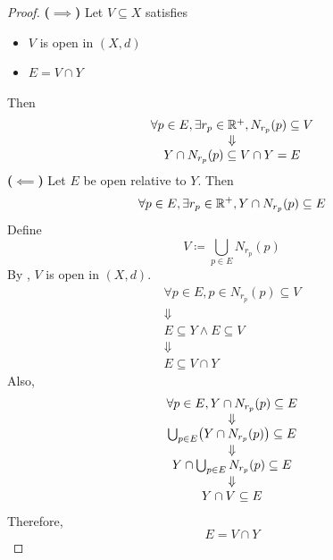 \begin{proof}
    \textbf{($\implies$)} Let $V \subseteq X$ satisfies
    \begin{itemize}
        \item $V$ is open in $(X, d)$
        \item $E = V \cap Y$
    \end{itemize}
    Then
    \[
    \begin{array}{c}
        \forall p \in E, \exists r_{p} \in \mathbb{R}^{+}, N_{r_{p}}(p) \subseteq V \\
        \Downarrow \\
        Y \cap N_{r_{p}}(p) \subseteq V \cap Y = E
    \end{array}
    \]
    \textbf{($\impliedby$)} Let $E$ be open relative to $Y$. Then
    \[
    \forall p \in E, \exists r_{p} \in \mathbb{R}^{+}, Y \cap N_{r_{p}}(p) \subseteq E
    \]
    Define
    \[
    V \coloneqq \bigcup_{p \in E} N_{r_{p}}(p)
    \]
    By , $V$ is open in $(X, d)$.
    \[
    \begin{array}{c}
        \forall p \in E, p \in N_{r_{p}}(p) \subseteq V \\
        \Downarrow \\
        E \subseteq Y \land E \subseteq V \\
        \Downarrow \\
        E \subseteq V \cap Y
    \end{array}
    \]
    Also,
    \[
    \begin{array}{c}
        \forall p \in E, Y \cap N_{r_{p}}(p) \subseteq E \\
        \Downarrow \\
        \bigcup_{p \in E} \paren*{Y \cap N_{r_{p}}(p)} \subseteq E \\
        \Downarrow \\
        Y \cap \bigcup_{p \in E} N_{r_{p}}(p) \subseteq E \\
        \Downarrow \\
        Y \cap V \subseteq E
    \end{array}
    \]
    Therefore,
    \[
    E = V \cap Y
    \]
\end{proof}